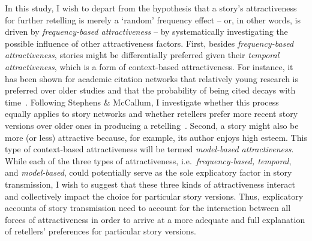 In this study, I wish to depart from the hypothesis that a story's attractiveness for further retelling is merely a `random' frequency effect -- or, in other words, is driven by \emph{frequency-based attractiveness} -- by systematically investigating the possible influence of other attractiveness factors. First, besides \emph{frequency-based attractiveness}, stories might be differentially preferred given their \emph{temporal attractiveness}, which is a form of context-based attractiveness. For instance, it has been shown for academic citation networks that relatively young research is preferred over older studies and that the probability of being cited decays with time~\autocite{dorogovtsev:2000,eom:2011,price:1976,Perc:2014}. Following Stephens \& McCallum, I investigate whether this process equally applies to story networks and whether retellers prefer more recent story versions over older ones in producing a retelling~\autocite{stephens_mccallum}. Second, a story might also be more (or less) attractive because, for example, its author enjoys high esteem. This type of context-based attractiveness will be termed \emph{model-based attractiveness}. While each of the three types of attractiveness, i.e.\ \emph{frequency-based, temporal}, and \emph{model-based}, could potentially serve as the sole explicatory factor in story transmission, I wish to suggest that these three kinds of attractiveness interact and collectively impact the choice for particular story versions. Thus, explicatory accounts of story transmission need to account for the interaction between all forces of attractiveness in order to arrive at a more adequate and full explanation of retellers' preferences for particular story versions.

